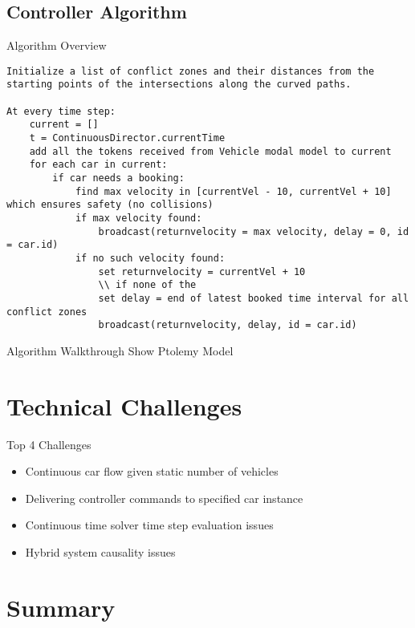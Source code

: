 \documentclass{beamer}
\begin{document}
\subsection{Controller Algorithm}
\begin{frame}{Algorithm Overview}
\begin{lstlisting}
Initialize a list of conflict zones and their distances from the starting points of the intersections along the curved paths.

At every time step:
    current = []
    t = ContinuousDirector.currentTime
    add all the tokens received from Vehicle modal model to current
    for each car in current:
        if car needs a booking:
            find max velocity in [currentVel - 10, currentVel + 10] which ensures safety (no collisions)
            if max velocity found:
                broadcast(returnvelocity = max velocity, delay = 0, id = car.id)
            if no such velocity found:
                set returnvelocity = currentVel + 10
                \\ if none of the 
                set delay = end of latest booked time interval for all conflict zones
                broadcast(returnvelocity, delay, id = car.id)
\end{lstlisting}
\end{frame}


\begin{frame}{Algorithm Walkthrough}
Show Ptolemy Model
\end{frame}

\section{Technical Challenges}

\begin{frame}
\begin{block}{Top 4 Challenges}
\begin{itemize}
\item Continuous car flow given static number of vehicles
\item Delivering controller commands to specified car instance
\item Continuous time solver time step evaluation issues
\item Hybrid system causality issues
\end{itemize}
\end{block}
\end{frame}


\section{Summary}
\end{document}
